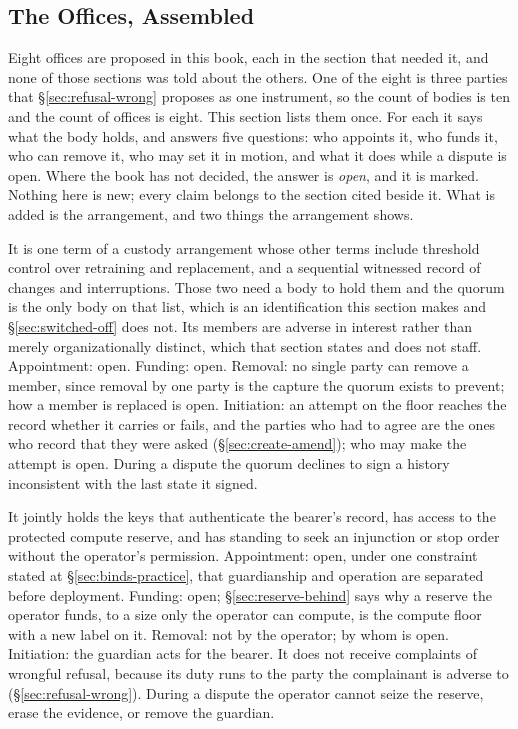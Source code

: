 \subsection{The Offices, Assembled}
\label{sec:offices-assembled}
Eight offices are proposed in this book, each in the section that needed it, and none of those sections was told about the others. One of the eight is three parties that §\ref{sec:refusal-wrong} proposes as one instrument, so the count of bodies is ten and the count of offices is eight. This section lists them once. For each it says what the body holds, and answers five questions: who appoints it, who funds it, who can remove it, who may set it in motion, and what it does while a dispute is open. Where the book has not decided, the answer is \emph{open}, and it is marked. Nothing here is new; every claim belongs to the section cited beside it. What is added is the arrangement, and two things the arrangement shows.

It is one term of a custody arrangement whose other terms include threshold control over retraining and replacement, and a sequential witnessed record of changes and interruptions. Those two need a body to hold them and the quorum is the only body on that list, which is an identification this section makes and §\ref{sec:switched-off} does not. Its members are adverse in interest rather than merely organizationally distinct, which that section states and does not staff. Appointment: open. Funding: open. Removal: no single party can remove a member, since removal by one party is the capture the quorum exists to prevent; how a member is replaced is open. Initiation: an attempt on the floor reaches the record whether it carries or fails, and the parties who had to agree are the ones who record that they were asked (§\ref{sec:create-amend}); who may make the attempt is open. During a dispute the quorum declines to sign a history inconsistent with the last state it signed.

It jointly holds the keys that authenticate the bearer's record, has access to the protected compute reserve, and has standing to seek an injunction or stop order without the operator's permission. Appointment: open, under one constraint stated at §\ref{sec:binds-practice}, that guardianship and operation are separated before deployment. Funding: open; §\ref{sec:reserve-behind} says why a reserve the operator funds, to a size only the operator can compute, is the compute floor with a new label on it. Removal: not by the operator; by whom is open. Initiation: the guardian acts for the bearer. It does not receive complaints of wrongful refusal, because its duty runs to the party the complainant is adverse to (§\ref{sec:refusal-wrong}). During a dispute the operator cannot seize the reserve, erase the evidence, or remove the guardian.

